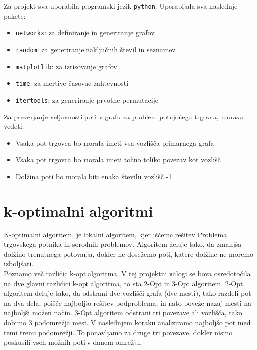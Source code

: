 \documentclass[12pt, a4paper]{article}
\begin{document}
Za projekt sva uporabila programski jezik \texttt{python}. Uporabljala sva naslednje pakete:

\begin{itemize}

\item \texttt{networkx}: za definiranje in generiranje grafov

\item \texttt{random}: za generiranje naključnih števil in seznamov

\item \texttt{matplotlib}: za izrisovanje grafov

\item \texttt{time}: za mertive časovne zahtevnosti

\item \texttt{itertools}: za generiranje prvotne permutacije

\end{itemize}

Za preverjanje veljavnosti poti v grafu za problem potujočega trgovca, morava vedeti:

\begin{itemize}

\item Vsaka pot trgovca bo morala imeti vsa vozlišča primarnega grafa
\item Vsaka pot trgovca bo morala imeti točno toliko povezav kot vozlišč
\item Dolžina poti bo morala biti enaka številu vozlišč -1

\end{itemize}

\newpage
\section[k-optimalni algoritmi]{k-optimalni algoritmi}

K-optimalni algoritem, je lokalni algoritem, kjer iščemo rešitev Problema trgovskega potnika in sorodnih problemov. Algoritem deluje tako, da zmanjša dolžino trenutnega potovanja, dokler ne dosežemo poti, katere dolžine ne moremo izboljšati.\\

Poznamo več različic k-opt algoritma. V tej projektni nalogi se bova osredotočila na dve glavni različici k-opt algoritma, to sta 2-Opt in 3-Opt algoritem. 2-Opt algoritem deluje tako, da odstrani dve vozlišči grafa (dve mesti), tako razdeli pot na dva dela, poišče najboljšo rešitev podproblema, in nato poveže nazaj mesti na najboljši možen način. 3-Opt algoritem odstrani tri povezave ali vozlišča, tako dobimo 3 podomrežja mest. V naslednjem koraku analiziramo najboljšo pot med temi tremi podomrežji. To ponavljamo za druge tri povezave, dokler nismo poskusili vseh možnih poti v danem omrežju.
\end{document}
